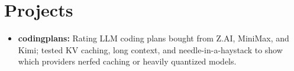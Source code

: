 \documentclass[11pt, letterpaper]{article}
\begin{document}
\section{Projects}
\begin{itemize}
  \item \textbf{codingplans:} Rating LLM coding plans bought from Z.AI, MiniMax, and Kimi; tested KV caching, long context, and needle-in-a-haystack to show which providers nerfed caching or heavily quantized models.
\end{itemize}
\end{document}
